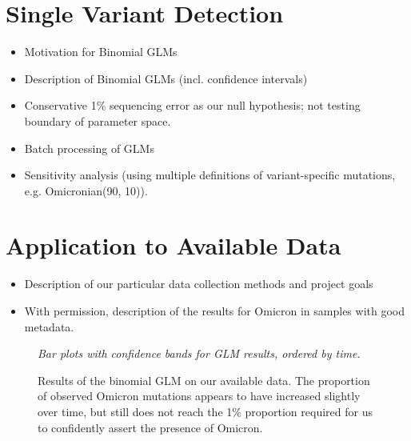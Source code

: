 \documentclass{article}
\newenvironment{tightemize}
{ \begin{itemize}
    \setlength{\itemsep}{0pt}
    \setlength{\parskip}{0pt}
    \setlength{\parsep}{0pt}     }
{ \end{itemize}                  }
\begin{document}
\section{Single Variant Detection}

\begin{tightemize}
    \item Motivation for Binomial GLMs
    \item Description of Binomial GLMs (incl. confidence intervals)
    \item Conservative 1\% sequencing error as our null hypothesis; not testing boundary of parameter space.
    \item Batch processing of GLMs
    \item Sensitivity analysis (using multiple definitions of variant-specific mutations, e.g. Omicronian(90, 10)).
\end{tightemize}






\section{Application to Available Data}

\begin{tightemize}
    \item Description of our particular data collection methods and project goals
    \item With permission, description of the results for Omicron in samples with good metadata.
\end{tightemize}

\begin{figure}[ht!]
\vspace{2cm}
\centering
\emph{Bar plots with confidence bands for GLM results, ordered by time.}
\vspace{2cm}
\caption{Results of the binomial GLM on our available data. The proportion of observed Omicron mutations appears to have increased slightly over time, but still does not reach the 1\% proportion required for us to confidently assert the presence of Omicron.}
\label{fig:binomial_results}
\end{figure}
\end{document}
